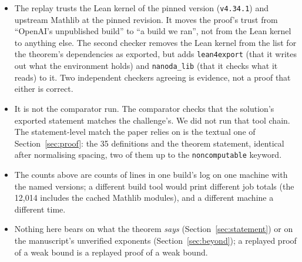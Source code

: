 \begin{itemize}
\item The replay trusts the Lean kernel of the pinned version
  (\texttt{v4.34.1}) and upstream Mathlib at the pinned revision. It
  moves the proof's trust from ``OpenAI's unpublished build'' to ``a
  build we ran'', not from the Lean kernel to anything else. The second
  checker removes the Lean kernel from the list for the theorem's
  dependencies as exported, but adds \texttt{lean4export} (that it
  writes out what the environment holds) and \texttt{nanoda\_lib} (that
  it checks what it reads) to it. Two independent checkers agreeing is
  evidence, not a proof that either is correct.
\item It is not the comparator run. The comparator checks that the
  solution's exported statement matches the challenge's. We did not run
  that tool chain. The statement-level match the paper relies on is
  the textual one of Section~\ref{sec:proof}: the 35 definitions and the
  theorem statement, identical after normalising spacing, two of them up
  to the \texttt{noncomputable} keyword.
\item The counts above are counts of lines in one build's log on one
  machine with the named versions; a different build tool would print
  different job totals (the 12,014 includes the cached Mathlib modules),
  and a different machine a different time.
\item Nothing here bears on what the theorem \emph{says}
  (Section~\ref{sec:statement}) or on the manuscript's unverified
  exponents (Section~\ref{sec:beyond}); a replayed proof of a weak bound
  is a replayed proof of a weak bound.
\end{itemize}
\par\endgroup
